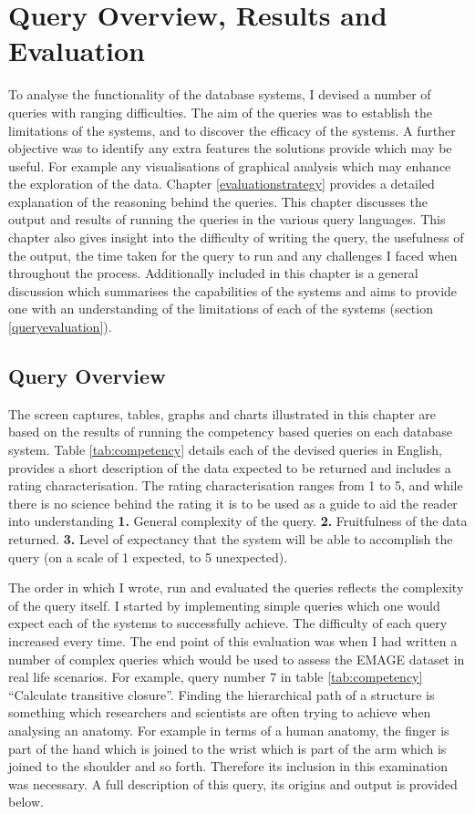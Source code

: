 \chapter{Query Overview, Results and Evaluation}\label{results}
To analyse the functionality of the database systems, I devised a number of queries with ranging difficulties. The aim of the queries was to establish the limitations of the systems, and to discover the efficacy of the systems. A further objective was to identify any extra features the solutions provide which may be useful. For example any visualisations of graphical analysis which may enhance the exploration of the data. Chapter \ref{evaluationstrategy} provides a detailed explanation of the reasoning behind the queries. This chapter discusses the output and results of running the queries in the various query languages. This chapter also gives insight into the difficulty of writing the query, the usefulness of the output, the time taken for the query to run and any challenges I faced when throughout the process. Additionally included in this chapter is a general discussion which summarises the capabilities of the systems and aims to provide one with an understanding of the limitations of each of the systems (section  \ref{queryevaluation}).

\section{Query Overview}\label{output}
The screen captures, tables, graphs and charts illustrated in this chapter are based on the results of running the competency based queries on each database system. Table \ref{tab:competency} details each of the devised queries in English, provides a short description of the data expected to be returned and includes a rating characterisation. The rating characterisation ranges from 1 to 5, and while there is no science behind the rating it is to be used as a guide to aid the reader into understanding \textbf{1.} General complexity of the query. \textbf{2.} Fruitfulness of the data returned. \textbf{3.} Level of expectancy that the system will be able to accomplish the query (on a scale of 1 expected, to 5 unexpected).

The order in which I wrote, run and evaluated the queries reflects the complexity of the query itself. I started by implementing simple queries which one would expect each of the systems to successfully achieve. The difficulty of each query increased every time. The end point of this evaluation was when I had written a number of complex queries which would be used to assess the EMAGE dataset in real life scenarios. For example, query number 7 in table \ref{tab:competency} ``Calculate transitive closure''. Finding the hierarchical path of a structure is something which researchers and scientists are often trying to achieve when analysing an anatomy. For example in terms of a human anatomy, the finger is part of the hand which is joined to the wrist which is part of the arm which is joined to the shoulder and so forth. Therefore its inclusion in this examination was necessary. A full description of this query, its origins and output is provided below. 

